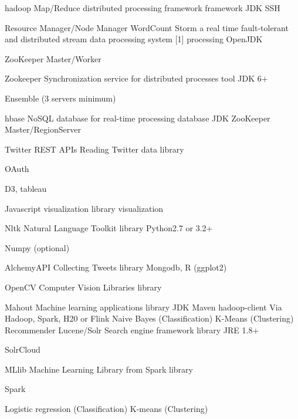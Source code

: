 \documentclass[9pt,twocolumn,twoside]{styles/osajnl}
\begin{document}
	hadoop
	Map/Reduce distributed processing framework
	framework
	JDK
SSH
	

	Resource Manager/Node Manager
	WordCount
	Storm
	a real time fault-tolerant and distributed stream data processing system [1]
	processing
	OpenJDK


	ZooKeeper
	Master/Worker
	

	Zookeeper
	Synchronization service for distributed processes
	tool
	JDK 6+
	

	Ensemble (3 servers minimum)

	

	hbase
	NoSQL database for real-time processing
	database
	JDK
	ZooKeeper
	Master/RegionServer
	

	Twitter REST APIs
	Reading Twitter data
	library
	

	OAuth
	

	

	D3, tableau

	Javascript visualization library
	visualization
	

	

	

	

	Nltk
	Natural Language Toolkit
	library
	Python2.7 or 3.2+

	Numpy (optional)
	

	

	AlchemyAPI
	Collecting Tweets
	library
	Mongodb, R (ggplot2)
	

	

	

	OpenCV
	Computer Vision Libraries
	library
	

	

	

	

	Mahout
	Machine learning applications
	library
	JDK
Maven
	hadoop-client
	Via Hadoop, Spark, H20 or Flink
	Naive Bayes (Classification)
K-Means (Clustering)
Recommender
	Lucene/Solr
	Search engine framework
	library
	JRE 1.8+
	

	SolrCloud
	

	MLlib
	Machine Learning Library from Spark
	library
	

	Spark
	

	Logistic regression (Classification)
K-means (Clustering)
	

	

	

	

	
\end{document}
